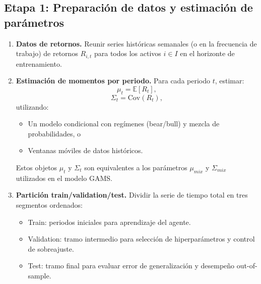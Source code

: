 \documentclass[12pt]{article}
\begin{document}
\subsection{Etapa 1: Preparación de datos y estimación de parámetros}
\begin{enumerate}
    \item \textbf{Datos de retornos.} Reunir series históricas semanales (o en la frecuencia de trabajo) de retornos $R_{i,t}$ para todos los activos $i \in I$ en el horizonte de entrenamiento.
    \item \textbf{Estimación de momentos por periodo.} Para cada periodo $t$, estimar:
    $$\mu_t = \mathbb{E}[R_t],$$
    $$\Sigma_t = \text{Cov}(R_t),$$
    utilizando:
    \begin{itemize}
        \item Un modelo condicional con regímenes (bear/bull) y mezcla de probabilidades, o
        \item Ventanas móviles de datos históricos.
    \end{itemize}
    Estos objetos $\mu_t$ y $\Sigma_t$ son equivalentes a los parámetros $\mu_{mix}$ y $\Sigma_{mix}$ utilizados en el modelo GAMS.
    \item \textbf{Partición train/validation/test.} Dividir la serie de tiempo total en tres segmentos ordenados:
    \begin{itemize}
        \item Train: periodos iniciales para aprendizaje del agente.
        \item Validation: tramo intermedio para selección de hiperparámetros y control de sobreajuste.
        \item Test: tramo final para evaluar error de generalización y desempeño out-of-sample.
    \end{itemize}
\end{enumerate}
\end{document}
